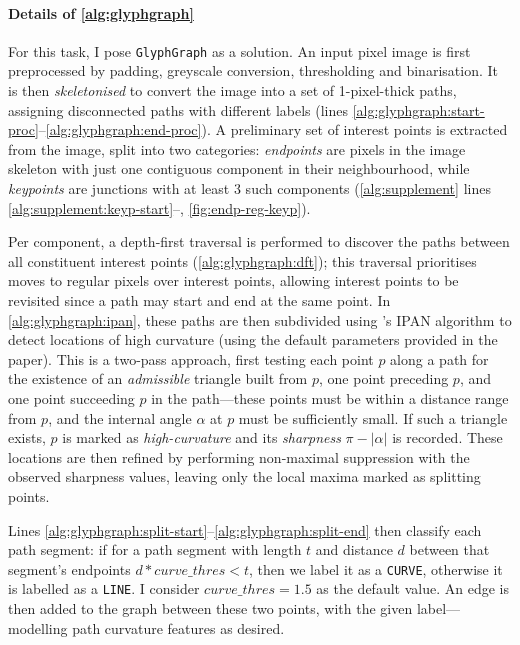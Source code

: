 \documentclass{mpaper}
\begin{document}
\paragraph{Details of \cref{alg:glyphgraph}}
For this task, I pose \texttt{GlyphGraph} as a solution.
An input pixel image is first preprocessed by padding, greyscale conversion, thresholding and binarisation.
It is then \emph{skeletonised} to convert the image into a set of 1-pixel-thick paths, assigning disconnected paths with different labels (lines \ref{alg:glyphgraph:start-proc}--\ref{alg:glyphgraph:end-proc}).
A preliminary set of interest points is extracted from the image, split into two categories: \emph{endpoints} are pixels in the image skeleton with just one contiguous component in their neighbourhood, while \emph{keypoints} are junctions with at least 3 such components (\cref{alg:supplement} lines \ref{alg:supplement:keyp-start}--, \cref{fig:endp-reg-keyp}).

Per component, a depth-first traversal is performed to discover the paths between all constituent interest points (\cref{alg:glyphgraph:dft}); this traversal prioritises moves to regular pixels over interest points, allowing interest points to be revisited since a path may start and end at the same point.
In \cref{alg:glyphgraph:ipan}, these paths are then subdivided using \citeauthor{PathCurvature}'s IPAN algorithm \cite{PathCurvature} to detect locations of high curvature (using the default parameters provided in the paper).
This is a two-pass approach, first testing each point $p$ along a path for the existence of an \emph{admissible} triangle built from $p$, one point preceding $p$, and one point succeeding $p$ in the path---these points must be within a distance range from $p$, and the internal angle $\alpha$ at $p$ must be sufficiently small.
If such a triangle exists, $p$ is marked as \emph{high-curvature} and its \emph{sharpness} $\pi - |\alpha|$ is recorded.
These locations are then refined by performing non-maximal suppression with the observed sharpness values, leaving only the local maxima marked as splitting points.

Lines \ref{alg:glyphgraph:split-start}--\ref{alg:glyphgraph:split-end} then classify each path segment: if for a path segment with length $t$ and distance $d$ between that segment's endpoints $d * curve\_thres < t$, then we label it as a \texttt{CURVE}, otherwise it is labelled as a \texttt{LINE}.
I consider $curve\_thres = 1.5$ as the default value.
An edge is then added to the graph between these two points, with the given label---modelling path curvature features as desired.
\end{document}
